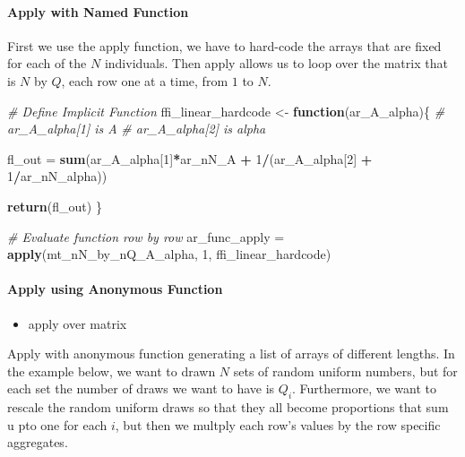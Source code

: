 \documentclass[
]{book}
\newenvironment{Shaded}{\begin{snugshade}}{\end{snugshade}}
\newcommand{\CommentTok}[1]{\textcolor[rgb]{0.56,0.35,0.01}{\textit{#1}}}
\newcommand{\ControlFlowTok}[1]{\textcolor[rgb]{0.13,0.29,0.53}{\textbf{#1}}}
\newcommand{\DecValTok}[1]{\textcolor[rgb]{0.00,0.00,0.81}{#1}}
\newcommand{\KeywordTok}[1]{\textcolor[rgb]{0.13,0.29,0.53}{\textbf{#1}}}
\newcommand{\NormalTok}[1]{#1}
\newcommand{\OperatorTok}[1]{\textcolor[rgb]{0.81,0.36,0.00}{\textbf{#1}}}
\newcommand{\StringTok}[1]{\textcolor[rgb]{0.31,0.60,0.02}{#1}}
\providecommand{\tightlist}{%
  \setlength{\itemsep}{0pt}\setlength{\parskip}{0pt}}
\begin{document}
\hypertarget{apply-with-named-function}{%
\paragraph{Apply with Named Function}\label{apply-with-named-function}}

First we use the apply function, we have to hard-code the arrays that are fixed for each of the \(N\) individuals. Then apply allows us to loop over the matrix that is \(N\) by \(Q\), each row one at a time, from \(1\) to \(N\).

\begin{Shaded}
\begin{Highlighting}[]
\CommentTok{\# Define Implicit Function}
\NormalTok{ffi\_linear\_hardcode \textless{}{-}}\StringTok{ }\ControlFlowTok{function}\NormalTok{(ar\_A\_alpha)\{}
  \CommentTok{\# ar\_A\_alpha[1] is A}
  \CommentTok{\# ar\_A\_alpha[2] is alpha}

\NormalTok{  fl\_out =}\StringTok{ }\KeywordTok{sum}\NormalTok{(ar\_A\_alpha[}\DecValTok{1}\NormalTok{]}\OperatorTok{*}\NormalTok{ar\_nN\_A }\OperatorTok{+}
\StringTok{                 }\DecValTok{1}\OperatorTok{/}\NormalTok{(ar\_A\_alpha[}\DecValTok{2}\NormalTok{] }\OperatorTok{+}\StringTok{ }\DecValTok{1}\OperatorTok{/}\NormalTok{ar\_nN\_alpha))}

  \KeywordTok{return}\NormalTok{(fl\_out)}
\NormalTok{\}}

\CommentTok{\# Evaluate function row by row}
\NormalTok{ar\_func\_apply =}\StringTok{ }\KeywordTok{apply}\NormalTok{(mt\_nN\_by\_nQ\_A\_alpha, }\DecValTok{1}\NormalTok{, ffi\_linear\_hardcode)}
\end{Highlighting}
\end{Shaded}

\hypertarget{apply-using-anonymous-function}{%
\paragraph{Apply using Anonymous Function}\label{apply-using-anonymous-function}}

\begin{itemize}
\tightlist
\item
  apply over matrix
\end{itemize}

Apply with anonymous function generating a list of arrays of different lengths. In the example below, we want to drawn \(N\) sets of random uniform numbers, but for each set the number of draws we want to have is \(Q_i\). Furthermore, we want to rescale the random uniform draws so that they all become proportions that sum u pto one for each \(i\), but then we multply each row's values by the row specific aggregates.
\end{document}
